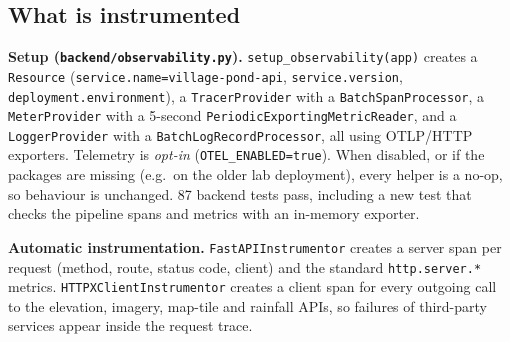 \documentclass[10.5pt,a4paper]{article}
\begin{document}
\subsection{What is instrumented}
\textbf{Setup (\texttt{backend/observability.py}).} \texttt{setup\_observability(app)} creates a \texttt{Resource} (\texttt{service.name=village-pond-api}, \texttt{service.version}, \texttt{deployment.environment}), a \texttt{TracerProvider} with a \texttt{BatchSpanProcessor}, a \texttt{MeterProvider} with a 5-second \texttt{PeriodicExportingMetricReader}, and a \texttt{LoggerProvider} with a \texttt{BatchLogRecordProcessor}, all using OTLP/HTTP exporters. Telemetry is \emph{opt-in} (\texttt{OTEL\_ENABLED=true}). When disabled, or if the packages are missing (e.g.\ on the older lab deployment), every helper is a no-op, so behaviour is unchanged. 87 backend tests pass, including a new test that checks the pipeline spans and metrics with an in-memory exporter.

\textbf{Automatic instrumentation.} \texttt{FastAPIInstrumentor} creates a server span per request (method, route, status code, client) and the standard \texttt{http.server.*} metrics. \texttt{HTTPXClientInstrumentor} creates a client span for every outgoing call to the elevation, imagery, map-tile and rainfall APIs, so failures of third-party services appear inside the request trace.
\end{document}
